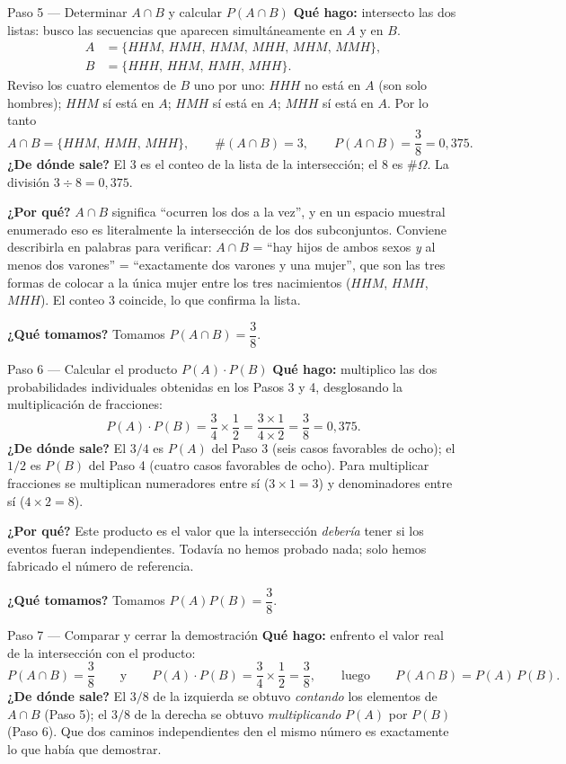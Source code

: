 \documentclass[11pt]{article}
\begin{document}
\begin{sol}
\begin{paso}{Paso 5 --- Determinar $A\cap B$ y calcular $P(A\cap B)$}
\textbf{Qué hago:} intersecto las dos listas: busco las secuencias que aparecen
simultáneamente en $A$ y en $B$.
\begin{align*}
A&=\{HHM,\,HMH,\,HMM,\,MHH,\,MHM,\,MMH\},\\
B&=\{HHH,\,HHM,\,HMH,\,MHH\}.
\end{align*}
Reviso los cuatro elementos de $B$ uno por uno: $HHH$ no está en $A$ (son solo hombres);
$HHM$ sí está en $A$; $HMH$ sí está en $A$; $MHH$ sí está en $A$. Por lo tanto
\[
A\cap B=\{HHM,\,HMH,\,MHH\},\qquad \#(A\cap B)=3,
\qquad
P(A\cap B)=\frac{3}{8}=0{,}375 .
\]
\textbf{¿De dónde sale?} El $3$ es el conteo de la lista de la intersección; el $8$ es
$\#\Omega$. La división $3\div 8=0{,}375$.

\textbf{¿Por qué?} $A\cap B$ significa ``ocurren los dos a la vez'', y en un espacio muestral
enumerado eso es literalmente la intersección de los dos subconjuntos. Conviene describirla
en palabras para verificar: $A\cap B$ = ``hay hijos de ambos sexos \emph{y} al menos dos
varones'' = ``exactamente dos varones y una mujer'', que son las tres formas de colocar a la
única mujer entre los tres nacimientos ($HHM$, $HMH$, $MHH$). El conteo $3$ coincide, lo que
confirma la lista.

\textbf{¿Qué tomamos?} Tomamos $P(A\cap B)=\dfrac{3}{8}$.
\end{paso}

\begin{paso}{Paso 6 --- Calcular el producto $P(A)\cdot P(B)$}
\textbf{Qué hago:} multiplico las dos probabilidades individuales obtenidas en los Pasos 3 y
4, desglosando la multiplicación de fracciones:
\[
P(A)\cdot P(B)=\frac{3}{4}\times\frac{1}{2}=\frac{3\times 1}{4\times 2}=\frac{3}{8}=0{,}375 .
\]
\textbf{¿De dónde sale?} El $3/4$ es $P(A)$ del Paso 3 (seis casos favorables de ocho); el
$1/2$ es $P(B)$ del Paso 4 (cuatro casos favorables de ocho). Para multiplicar fracciones se
multiplican numeradores entre sí ($3\times1=3$) y denominadores entre sí ($4\times2=8$).

\textbf{¿Por qué?} Este producto es el valor que la intersección \emph{debería} tener si los
eventos fueran independientes. Todavía no hemos probado nada; solo hemos fabricado el número
de referencia.

\textbf{¿Qué tomamos?} Tomamos $P(A)P(B)=\dfrac{3}{8}$.
\end{paso}

\begin{paso}{Paso 7 --- Comparar y cerrar la demostración}
\textbf{Qué hago:} enfrento el valor real de la intersección con el producto:
\[
P(A\cap B)=\frac{3}{8}
\qquad\text{y}\qquad
P(A)\cdot P(B)=\frac{3}{4}\times\frac{1}{2}=\frac{3}{8},
\qquad\text{luego}\qquad
P(A\cap B)=P(A)\,P(B).
\]
\textbf{¿De dónde sale?} El $3/8$ de la izquierda se obtuvo \emph{contando} los elementos de
$A\cap B$ (Paso 5); el $3/8$ de la derecha se obtuvo \emph{multiplicando} $P(A)$ por $P(B)$
(Paso 6). Que dos caminos independientes den el mismo número es exactamente lo que había que
demostrar.


\end{paso}
\end{sol}
\end{document}
